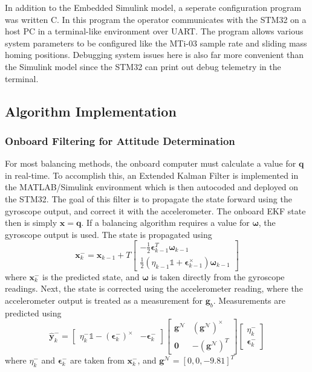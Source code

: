 In addition to the Embedded Simulink model, a seperate configuration program was written C. In this program the operator communicates with the STM32 on a host PC in a terminal-like environment over UART. The program allows various system parameters to be configured like the MTi-03 sample rate and sliding mass homing positions. Debugging system issues here is also far more convenient than the Simulink model since the STM32 can print out debug telemetry in the terminal.

\subsection{Algorithm Implementation}

\subsubsection{Onboard Filtering for Attitude Determination}\label{sec:EKF}

For most balancing methods, the onboard computer must calculate a value for $\bm{q}$ in real-time. To accomplish this, an Extended Kalman Filter is implemented in the MATLAB/Simulink environment which is then autocoded and deployed on the STM32. The goal of this filter is to propagate the state forward using the gyroscope output, and correct it with the accelerometer. The onboard EKF state then is simply $\bm{x} = \bm{q}$. If a balancing algorithm requires a value for $\bm{\omega}$, the gyroscope output is used. The state is propagated using
\begin{equation}\label{equation:EKF_process}
    \bm{x}_k^-=\bm{x}_{k-1} + T\begin{bmatrix}
    
    -\frac{1}{2}\bm{\epsilon}_{k-1}^T\bm{\omega}_{k-1} \\
    \frac{1}{2}(\eta_{k-1}\mathbb{1} +
    \bm{\epsilon}_{k-1}^{\times})\bm{\omega}_{k-1}
\end{bmatrix}
\end{equation}
where $\bm{x}_k^-$ is the predicted state, and $\bm{\omega}$ is taken directly from the gyroscope readings. Next, the state is corrected using the accelerometer reading, where the accelerometer output is treated as a measurement for $\bm{g}_b$. Measurements are predicted using 
\begin{equation}\label{equation:EKF_meas}
    \hat{\bm{y}}_k^-=
    \begin{bmatrix}    
    \eta_k^-\mathbb{1}-(\bm{\epsilon}_k^-)^{\times} & -\bm{\epsilon}_k^-
    \end{bmatrix}
    \begin{bmatrix}    
    \bm{g}^\mathcal{N} & (\bm{g}^\mathcal{N})^{\times} \\
    \bm{0} & - (\bm{g}^\mathcal{N})^T
    \end{bmatrix}
    \begin{bmatrix}    
    \eta_k^- \\
    \bm{\epsilon}_k^-
    \end{bmatrix}
\end{equation}
where $\eta_k^-$ and $\bm{\epsilon}_k^-$ are taken from $\bm{x}_k^-$, and $\bm{g}^\mathcal{N}=[0, 0,-9.81]^T$


